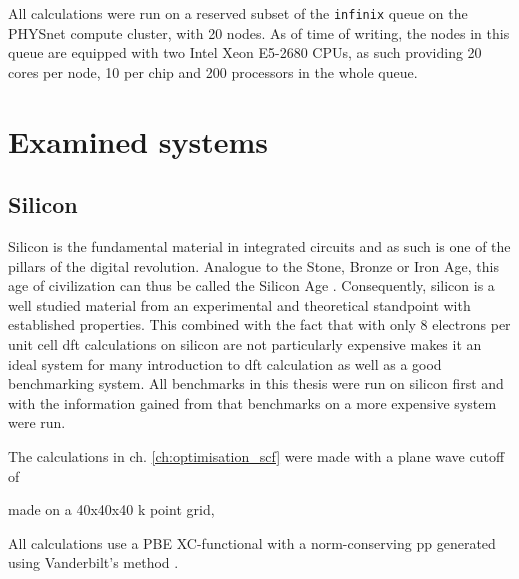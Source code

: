\documentclass[main.tex]{subfiles}
\begin{document}
All calculations were run on a reserved subset of the \texttt{infinix} queue on the PHYSnet compute cluster, with 20 nodes.
As of time of writing, the nodes in this queue are equipped with two Intel Xeon E5-2680 CPUs, as such providing 20 cores per node, 10 per chip and 200 processors in the whole queue.



\section{Examined systems}\label{sec:examined_systems}

\subsection{Silicon}\label{sub:systems_silicon}

Silicon is the fundamental material in integrated circuits and as such is one of the pillars of the digital revolution.
Analogue to the Stone, Bronze or Iron Age, this age of civilization can thus be called the Silicon Age \cite{chabal_fundamental_2001}.
Consequently, silicon is a well studied material from an experimental and theoretical standpoint with established properties.
This combined with the fact that with only 8 electrons per unit cell \acrshort{dft} calculations on silicon are not particularly expensive makes it an ideal system for many introduction to \acrshort{dft} calculation as well as a good benchmarking system.
All benchmarks in this thesis were run on silicon first and with the information gained from that benchmarks on a more expensive system were run.

The calculations in ch. \ref{ch:optimisation_scf} were made with a plane wave cutoff of

made on a 40x40x40 k point grid, 

All calculations use a PBE XC-functional with a norm-conserving \acrshort{pp} generated using Vanderbilt's method \cite{hamann_erratum_2017}.


\subsection{\TaS}\label{sub:systems_tas2}
\end{document}
